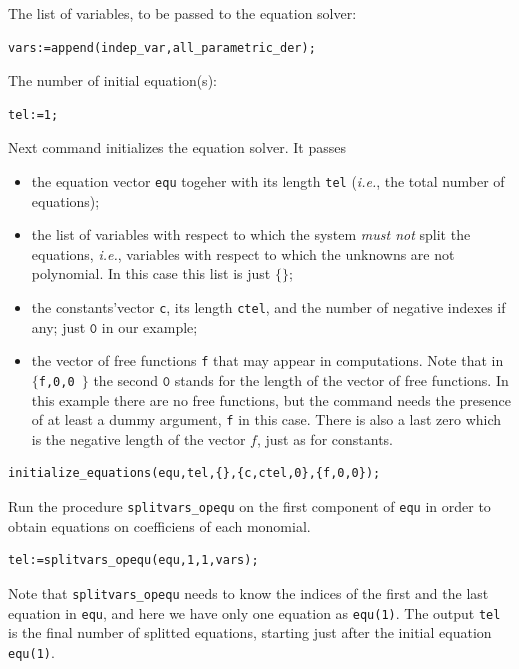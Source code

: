 The list of variables, to be passed to the equation solver:
\begin{verbatim}
vars:=append(indep_var,all_parametric_der);
\end{verbatim}
The number of initial equation(s):
\begin{verbatim}
tel:=1;
\end{verbatim}
Next command initializes the equation solver.  It passes
\begin{itemize}
  \item the equation vector \texttt{equ} togeher with its length \texttt{tel}
    (\emph{i.e.}, the total number of equations);
  \item the list of variables with respect to which the system \emph{must not}
    split the equations, \emph{i.e.}, variables with respect to which the
    unknowns are not polynomial. In this case this list is just $\{\}$;
  \item the constants'vector \texttt{c}, its length \texttt{ctel}, and the
    number of negative indexes if any; just $\texttt{0}$ in our example;
  \item the vector of free functions \texttt{f} that may appear in
    computations. Note that in \texttt{$\{$f,0,0 $\}$} the second $\texttt{0}$
    stands for the length of the vector of free functions. In this example
    there are no free functions, but the command needs the presence of at least
    a dummy argument, \texttt{f} in this case. There is also a last zero which
    is the negative length of the vector $f$, just as for constants.
  \end{itemize}
\hypertarget{operator:INITIALIZE_EQUATIONS}{}
\begin{verbatim}
initialize_equations(equ,tel,{},{c,ctel,0},{f,0,0});
\end{verbatim}
Run the procedure \texttt{splitvars\_opequ} on the first component of
\texttt{equ} in order to obtain equations on coefficiens of each monomial.
\hypertarget{operator:SPLITVARS_OPEQU}{}
\begin{verbatim}
tel:=splitvars_opequ(equ,1,1,vars);
\end{verbatim}
Note that \texttt{splitvars\_opequ} needs to know the indices of the first and
the last equation in \texttt{equ}, and here we have only one equation as
\texttt{equ(1)}. The output \texttt{tel} is the final number of splitted
equations, starting just after the initial equation \texttt{equ(1)}.

